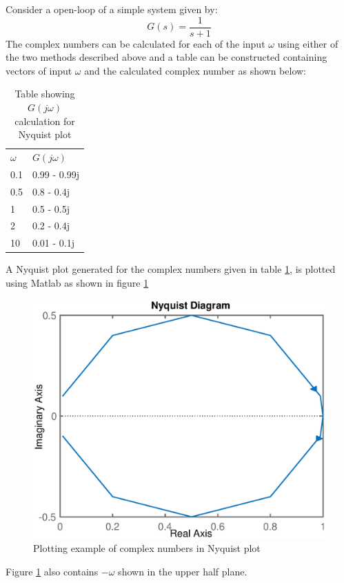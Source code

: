 Consider a open-loop of a simple system given by:
\begin{equation}
	G(s) = \frac{1}{s + 1}
\end{equation}
The complex numbers can be calculated for each of the input $\omega$ using either of the two methods described above and a table can be constructed containing vectors of input $\omega$ and the calculated complex number as shown below:
\begin{table}[h!]
	\centering
	\begin{tabular}{m{4cm} | m{4cm}}
		\toprule
		$\omega$ & $G(j\omega)$ \\
		\cmidrule{1-2}
		0.1 & 0.99 - 0.99j \\
		0.5 & 0.8 - 0.4j \\
		1 & 0.5 - 0.5j \\
		2 & 0.2 - 0.4j \\
		10 & 0.01 - 0.1j\\
		\bottomrule
	\end{tabular}
	\caption{Table showing $G(j\omega)$ calculation for Nyquist plot}
	\label{Tab_Gjw_calculation_NyquistPlot}
\end{table}
A Nyquist plot generated for the complex numbers given in table \ref{Tab_Gjw_calculation_NyquistPlot}, is plotted using Matlab as shown in figure \ref{Fig_FrRes_NyquistEx1}
\begin{figure}[h!]
	\centering
	\includegraphics[width=0.7\linewidth]{Bilder/FrRes_NyquistEx1.eps}
	\caption{Plotting example of complex numbers in Nyquist plot}
	\label{Fig_FrRes_NyquistEx1}
\end{figure}
\newpage
Figure \ref{Fig_FrRes_NyquistEx1} also contains $-\omega$ shown in the upper half plane.